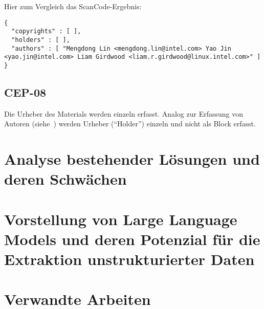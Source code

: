 Hier zum Vergleich das ScanCode-Ergebnis:

\begin{lstlisting}[numbers=none, keepspaces=true]
{
  "copyrights" : [ ],
  "holders" : [ ],
  "authors" : [ "Mengdong Lin <mengdong.lin@intel.com> Yao Jin <yao.jin@intel.com> Liam Girdwood <liam.r.girdwood@linux.intel.com>" ]
}
\end{lstlisting}


\subsection{CEP-08}\label{subsec:cep-08}

Die Urheber des Materials werden einzeln erfasst.
Analog zur Erfassung von Autoren (siehe~) werden Urheber (\enquote{Holder}) einzeln und nicht als Block erfasst.


\section{Analyse bestehender Lösungen und deren Schwächen}\label{sec:analyse-bestehender-losungen}


\section{Vorstellung von Large Language Models und deren Potenzial für die Extraktion unstrukturierter Daten}\label{sec:vorstellung-llm}


\section{Verwandte Arbeiten}\label{sec:verwandte-arbeiten}

